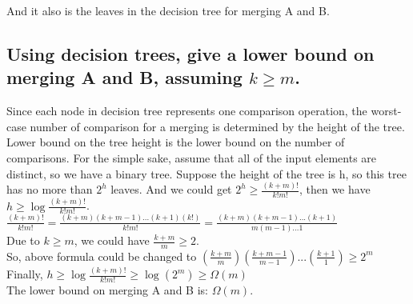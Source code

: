 \documentclass[12pt, a4paper]{report}
\begin{document}
And it also is the leaves in the decision tree for merging A and B.

\subsection{Using decision trees, give a lower bound on merging A and B, assuming $k \geq m$.}
Since each node in decision tree represents one comparison operation, the worst-case number of comparison for a merging is determined by the height of the tree. Lower bound on the tree height is the lower bound on the number of comparisons. For the simple sake, assume that all of the input elements are distinct, so we have a binary tree. Suppose the height of the tree is h, so this tree has no more than $2^{h}$ leaves. And we could get $2^{h} \geq \frac{(k+m)!}{k!m!}$, then we have $h \geq \log \frac{(k+m)!}{k!m!}$.\\[0.5cm]
$\frac{(k+m)!}{k!m!} = \frac{(k+m)(k+m-1)...(k+1)(k!)}{k!m!} = \frac{(k+m)(k+m-1)...(k+1)}{m(m-1)...1}$ \\[0.5cm]
Due to $k \geq m$, we could have $\frac{k+m}{m} \geq 2$. \\
So, above formula could be changed to $(\frac{k+m}{m}) (\frac{k+m-1}{m-1}) ... (\frac{k+1}{1}) \geq 2^{m}$ \\
Finally, $h \geq \log \frac{(k+m)!}{k!m!} \geq \log (2^{m}) \geq \Omega (m)$ \\
The lower bound on merging A and B is: $\Omega (m)$.
\end{document}
